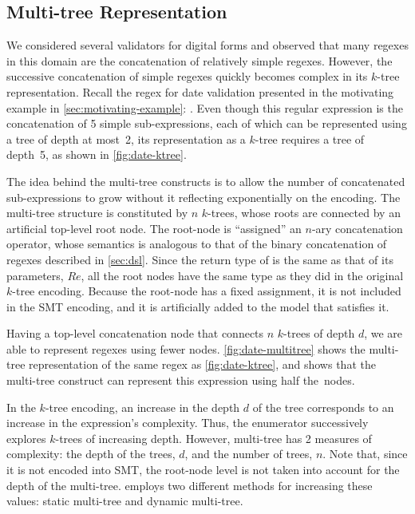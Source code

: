 \subsection{Multi-tree Representation}\label{sec:multi-tree}
We considered several validators for digital forms and observed that many regexes in this domain are the concatenation of relatively simple regexes. However, the successive concatenation of simple regexes quickly becomes complex in its \(k\)-tree representation.
%
Recall the regex for date validation presented in the motivating example in \autoref{sec:motivating-example}: .
%
Even though this regular expression is the concatenation of 5 simple sub-expressions, each of which can be represented using a tree of depth at most~2, its representation as a {\(k\)-tree} requires a tree of depth~5, as shown in \autoref{fig:date-ktree}.



The idea behind the multi-tree constructs is to allow the number of concatenated sub-expressions to grow without it reflecting exponentially on the encoding. The multi-tree structure is constituted by \(n\) \(k\)-trees, whose roots are connected by an artificial top-level root node. The root-node is ``assigned'' an \(n\)-ary concatenation operator, whose semantics is analogous to that of the binary concatenation of regexes described in \autoref{sec:dsl}. Since the return type of \Concat{} is the same as that of its parameters, \(Re\), all the root nodes have the same type as they did in the original \(k\)-tree encoding. %
Because the root-node has a fixed assignment, it is not included in the \ac{SMT} encoding, and it is artificially added to the model that satisfies it.

Having a top-level concatenation node that connects \(n\) \(k\)-trees of depth \(d\), we are able to represent regexes using fewer nodes. \autoref{fig:date-multitree} shows the multi-tree representation of the same regex as \autoref{fig:date-ktree}, and shows that the multi-tree construct can represent this expression using half the~nodes.

In the \(k\)-tree encoding, an increase in the depth \(d\) of the tree corresponds to an increase in the expression's complexity. Thus, the enumerator successively explores \(k\)-trees of increasing depth. However, multi-tree has 2 measures of complexity: the depth of the trees, \(d\), and the number of trees, \(n\). Note that, since it is not encoded into \ac{SMT}, the root-node level is not taken into account for the depth of the multi-tree. \Forest{} employs two different methods for increasing these values: static multi-tree and dynamic multi-tree.


